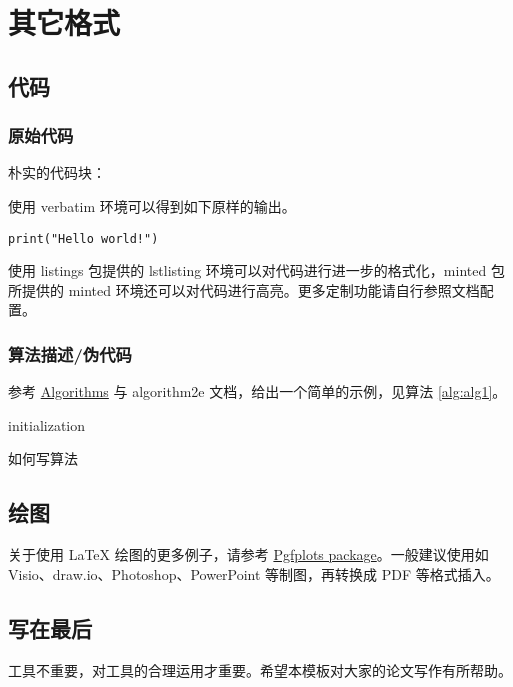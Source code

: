 
\chapter{其它格式}
\section{代码}
\subsection{原始代码}
朴实的代码块：

使用 verbatim 环境可以得到如下原样的输出。
\begin{verbatim}
print("Hello world!")
\end{verbatim}

使用 listings 包提供的 lstlisting 环境可以对代码进行进一步的格式化，minted 包所提供的 minted 环境还可以对代码进行高亮。更多定制功能请自行参照文档配置。

\subsection{算法描述/伪代码}
参考 \href{https://en.wikibooks.org/wiki/LaTeX/Algorithms}{Algorithms} 与 algorithm2e 文档，给出一个简单的示例，见算法 \ref{alg:alg1}。

\begin{algorithm}
  \SetAlgoLined
  initialization\;
  \caption{如何写算法}\label{alg:alg1}
\end{algorithm}

\section{绘图}
关于使用 \LaTeX{} 绘图的更多例子，请参考 \href{https://www.overleaf.com/learn/latex/Pgfplots_package}{Pgfplots package}。一般建议使用如 Visio、draw.io、Photoshop、PowerPoint 等制图，再转换成 PDF 等格式插入。

\section{写在最后}
工具不重要，对工具的合理运用才重要。希望本模板对大家的论文写作有所帮助。
